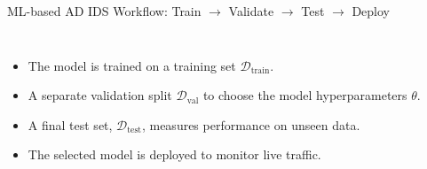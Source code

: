 \begin{frame}{ML-based AD IDS Workflow: Train $\rightarrow$ Validate $\rightarrow$ Test $\rightarrow$ Deploy}
    \small
    \begin{columns}[T,onlytextwidth]

        \begin{itemize}
            \setlength\itemsep{0.9em}

            \item<1-> The model is trained on a training set
                  \textbf{\(\mathcal{D}_{\text{train}}\)}.

            \item<2-> A separate validation split
                  \textbf{\(\mathcal{D}_{\text{val}}\)} to choose the model
                  hyperparameters \(\theta\).

            \item<3-> A final test set, \textbf{\(\mathcal{D}_{\text{test}}\)},
                  measures performance on unseen data.

            \item<4-> The selected model is deployed to monitor live traffic.
        \end{itemize}




\end{columns}
\end{frame}

